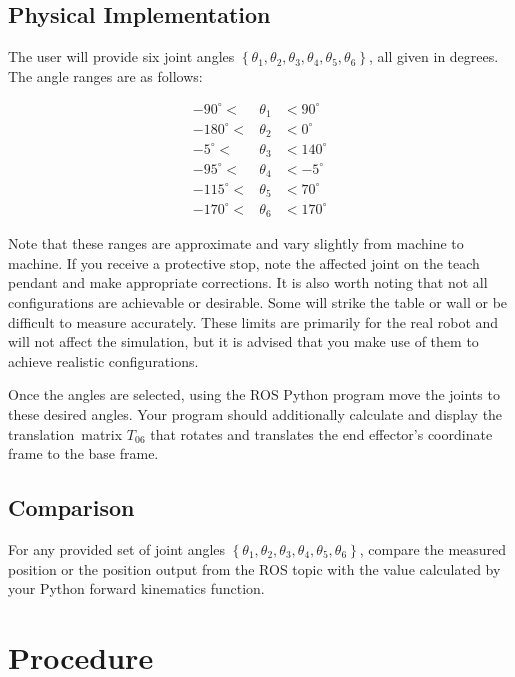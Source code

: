 \subsection{Physical Implementation} \label{sec:physical}
The user will provide six joint angles $\left\{\theta_1,\theta_2,\theta_3,\theta_4,\theta_5,\theta_6\right\}$, all given in degrees.  The angle ranges are as follows:

\begin{eqnarray*}
-90^{\circ}<&\theta_1&<90^{\circ}\\
-180^{\circ}<&\theta_2&<0^{\circ}\\
-5^{\circ}<&\theta_3&<140^{\circ}\\
-95^{\circ}<&\theta_4&<-5^{\circ}\\
-115^{\circ}<&\theta_5&<70^{\circ}\\
-170^{\circ}<&\theta_6&<170^{\circ}
\end{eqnarray*}

Note that these ranges are approximate and vary slightly from machine to machine.  If you receive a protective stop, note the affected joint on the teach pendant and make appropriate corrections. 
It is also worth noting that not all configurations are achievable or desirable.  Some will strike the table or wall or be difficult to measure accurately. 
These limits are primarily for the real robot and will not affect the simulation, but it is advised that you make use of them to achieve realistic configurations.

Once the angles are selected, using the ROS Python program move the joints to these desired angles.  Your program should additionally calculate and display the translation\
matrix $T_{06}$ that rotates and translates the end effector's coordinate frame to the base frame.

\subsection{Comparison}
For any provided set of joint angles $\left\{\theta_1,\theta_2,\theta_3,\theta_4,\theta_5,\theta_6\right\}$, compare the measured position or the position output from the ROS topic with the value calculated by your Python forward kinematics function.  

\section{Procedure}
	
